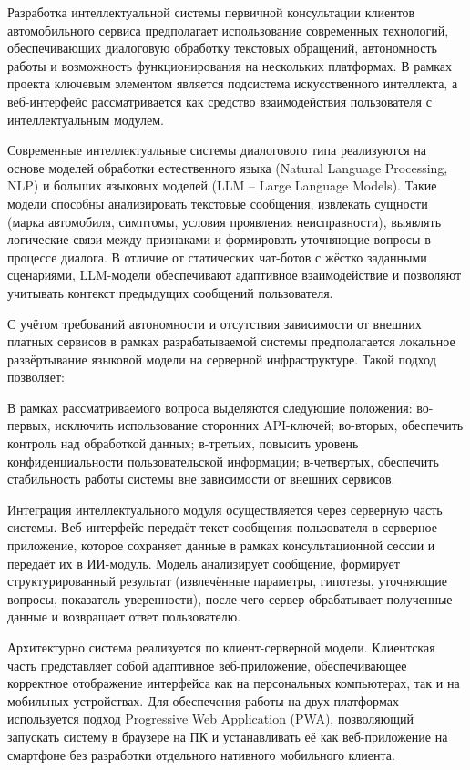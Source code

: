 \documentclass[14pt,a4paper]{extarticle}
\numberwithin{figure}{section}
\numberwithin{table}{section}
\begin{document}
Разработка интеллектуальной системы первичной консультации клиентов
автомобильного сервиса предполагает использование современных
технологий, обеспечивающих диалоговую обработку текстовых обращений,
автономность работы и возможность функционирования на нескольких
платформах. В рамках проекта ключевым элементом является подсистема
искусственного интеллекта, а веб-интерфейс рассматривается как средство
взаимодействия пользователя с интеллектуальным модулем.

Современные интеллектуальные системы диалогового типа реализуются на
основе моделей обработки естественного языка (Natural Language
Processing, NLP) и больших языковых моделей (LLM -- Large Language
Models). Такие модели способны анализировать текстовые сообщения,
извлекать сущности (марка автомобиля, симптомы, условия проявления
неисправности), выявлять логические связи между признаками и формировать
уточняющие вопросы в процессе диалога. В отличие от статических
чат-ботов с жёстко заданными сценариями, LLM-модели обеспечивают
адаптивное взаимодействие и позволяют учитывать контекст предыдущих
сообщений пользователя.

С учётом требований автономности и отсутствия зависимости от внешних
платных сервисов в рамках разрабатываемой системы предполагается
локальное развёртывание языковой модели на серверной инфраструктуре.
Такой подход позволяет:


В рамках рассматриваемого вопроса выделяются следующие положения: во-первых, исключить использование сторонних API-ключей; во-вторых, обеспечить контроль над обработкой данных; в-третьих, повысить уровень конфиденциальности пользовательской информации; в-четвертых, обеспечить стабильность работы системы вне зависимости от внешних сервисов.


Интеграция интеллектуального модуля осуществляется через серверную часть
системы. Веб-интерфейс передаёт текст сообщения пользователя в серверное
приложение, которое сохраняет данные в рамках консультационной сессии и
передаёт их в ИИ-модуль. Модель анализирует сообщение, формирует
структурированный результат (извлечённые параметры, гипотезы, уточняющие
вопросы, показатель уверенности), после чего сервер обрабатывает
полученные данные и возвращает ответ пользователю.

Архитектурно система реализуется по клиент-серверной модели. Клиентская
часть представляет собой адаптивное веб-приложение, обеспечивающее
корректное отображение интерфейса как на персональных компьютерах, так и
на мобильных устройствах. Для обеспечения работы на двух платформах
используется подход Progressive Web Application (PWA), позволяющий
запускать систему в браузере на ПК и устанавливать её как веб-приложение
на смартфоне без разработки отдельного нативного мобильного клиента.
\end{document}
